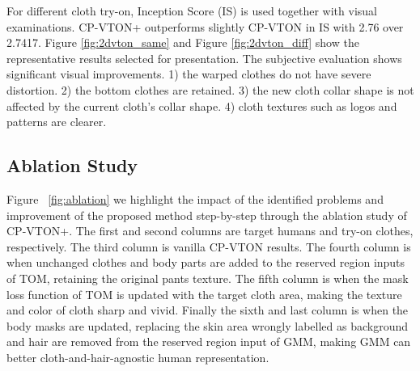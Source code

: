 
For different cloth try-on, Inception Score (IS) is used together with visual examinations. CP-VTON+ outperforms slightly CP-VTON in IS with 2.76 over 2.7417. Figure \ref{fig:2dvton_same} and Figure \ref{fig:2dvton_diff} show the representative results selected for presentation. The subjective evaluation shows significant visual improvements.  1) the warped clothes do not have severe distortion. 2) the bottom clothes are retained. 3) the new cloth collar shape is not affected by the current cloth's collar shape. 4) cloth textures such as logos and patterns are clearer.
 
 



\subsection{Ablation Study}

Figure ~\ref{fig:ablation} we highlight the impact of the identified problems and improvement of the proposed method step-by-step through the ablation study of CP-VTON+. The first and second columns are target humans and try-on clothes, respectively. The third column is vanilla CP-VTON results. The fourth column is when unchanged clothes and body parts are added to the reserved region inputs of TOM, retaining the original pants texture. The fifth column is when the mask loss function of TOM is updated with the target cloth area, making the texture and color of cloth sharp and vivid. Finally the sixth and last column is when the body masks are updated, replacing the skin area wrongly labelled as background and hair are removed from the reserved region input of GMM, making GMM can better cloth-and-hair-agnostic human representation.  


